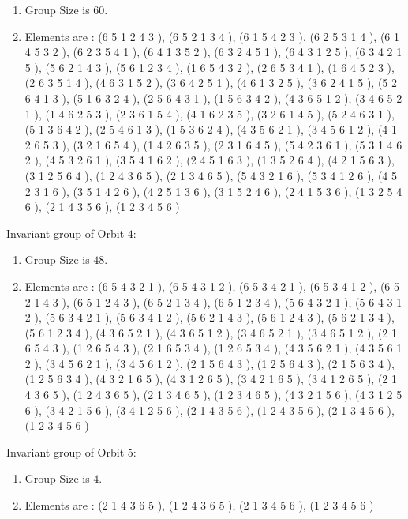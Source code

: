 \documentclass[12pt]{article}
\begin{document}
\begin{enumerate}
\item Group Size is $60$.
\item Elements are : (6 5 1 2 4 3  ), (6 5 2 1 3 4  ), (6 1 5 4 2 3  ), (6 2 5 3 1 4  ), (6 1 4 5 3 2  ), (6 2 3 5 4 1  ), (6 4 1 3 5 2  ), (6 3 2 4 5 1  ), (6 4 3 1 2 5  ), (6 3 4 2 1 5  ), (5 6 2 1 4 3  ), (5 6 1 2 3 4  ), (1 6 5 4 3 2  ), (2 6 5 3 4 1  ), (1 6 4 5 2 3  ), (2 6 3 5 1 4  ), (4 6 3 1 5 2  ), (3 6 4 2 5 1  ), (4 6 1 3 2 5  ), (3 6 2 4 1 5  ), (5 2 6 4 1 3  ), (5 1 6 3 2 4  ), (2 5 6 4 3 1  ), (1 5 6 3 4 2  ), (4 3 6 5 1 2  ), (3 4 6 5 2 1  ), (1 4 6 2 5 3  ), (2 3 6 1 5 4  ), (4 1 6 2 3 5  ), (3 2 6 1 4 5  ), (5 2 4 6 3 1  ), (5 1 3 6 4 2  ), (2 5 4 6 1 3  ), (1 5 3 6 2 4  ), (4 3 5 6 2 1  ), (3 4 5 6 1 2  ), (4 1 2 6 5 3  ), (3 2 1 6 5 4  ), (1 4 2 6 3 5  ), (2 3 1 6 4 5  ), (5 4 2 3 6 1  ), (5 3 1 4 6 2  ), (4 5 3 2 6 1  ), (3 5 4 1 6 2  ), (2 4 5 1 6 3  ), (1 3 5 2 6 4  ), (4 2 1 5 6 3  ), (3 1 2 5 6 4  ), (1 2 4 3 6 5  ), (2 1 3 4 6 5  ), (5 4 3 2 1 6  ), (5 3 4 1 2 6  ), (4 5 2 3 1 6  ), (3 5 1 4 2 6  ), (4 2 5 1 3 6  ), (3 1 5 2 4 6  ), (2 4 1 5 3 6  ), (1 3 2 5 4 6  ), (2 1 4 3 5 6  ), (1 2 3 4 5 6  )
\end{enumerate}
Invariant group of Orbit $4$:
\begin{enumerate}
\item Group Size is $48$.
\item Elements are : (6 5 4 3 2 1  ), (6 5 4 3 1 2  ), (6 5 3 4 2 1  ), (6 5 3 4 1 2  ), (6 5 2 1 4 3  ), (6 5 1 2 4 3  ), (6 5 2 1 3 4  ), (6 5 1 2 3 4  ), (5 6 4 3 2 1  ), (5 6 4 3 1 2  ), (5 6 3 4 2 1  ), (5 6 3 4 1 2  ), (5 6 2 1 4 3  ), (5 6 1 2 4 3  ), (5 6 2 1 3 4  ), (5 6 1 2 3 4  ), (4 3 6 5 2 1  ), (4 3 6 5 1 2  ), (3 4 6 5 2 1  ), (3 4 6 5 1 2  ), (2 1 6 5 4 3  ), (1 2 6 5 4 3  ), (2 1 6 5 3 4  ), (1 2 6 5 3 4  ), (4 3 5 6 2 1  ), (4 3 5 6 1 2  ), (3 4 5 6 2 1  ), (3 4 5 6 1 2  ), (2 1 5 6 4 3  ), (1 2 5 6 4 3  ), (2 1 5 6 3 4  ), (1 2 5 6 3 4  ), (4 3 2 1 6 5  ), (4 3 1 2 6 5  ), (3 4 2 1 6 5  ), (3 4 1 2 6 5  ), (2 1 4 3 6 5  ), (1 2 4 3 6 5  ), (2 1 3 4 6 5  ), (1 2 3 4 6 5  ), (4 3 2 1 5 6  ), (4 3 1 2 5 6  ), (3 4 2 1 5 6  ), (3 4 1 2 5 6  ), (2 1 4 3 5 6  ), (1 2 4 3 5 6  ), (2 1 3 4 5 6  ), (1 2 3 4 5 6  )
\end{enumerate}
Invariant group of Orbit $5$:
\begin{enumerate}
\item Group Size is $4$.
\item Elements are : (2 1 4 3 6 5  ), (1 2 4 3 6 5  ), (2 1 3 4 5 6  ), (1 2 3 4 5 6  )
\end{enumerate}
\end{document}
